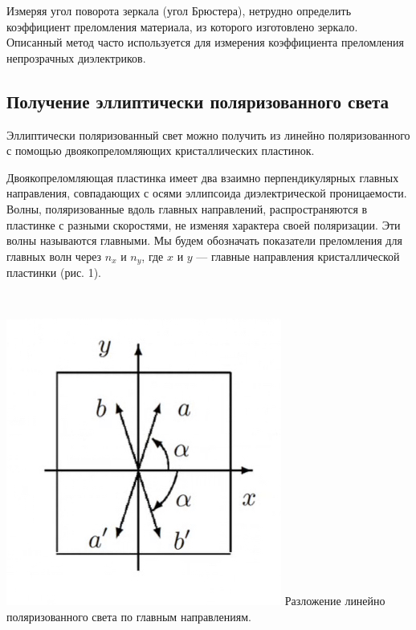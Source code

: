 \documentclass[14pt, a4paper]{report}
\begin{document}
Измеряя угол поворота зеркала (угол Брюстера), нетрудно определить коэффициент преломления материала, из которого изготовлено зеркало. Описанный метод часто используется для измерения коэффициента преломления непрозрачных диэлектриков.

\subsection{Получение эллиптически поляризованного света}


\begin{minipage}{0.6\textwidth}
Эллиптически поляризованный свет можно получить из линейно поляризованного с помощью двоякопреломляющих кристаллических пластинок.

Двоякопреломляющая пластинка имеет два взаимно перпендикулярных главных направления, совпадающих с осями эллипсоида диэлектрической проницаемости. Волны, поляризованные вдоль главных направлений, распространяются в пластинке с разными скоростями, не изменяя характера своей поляризации. Эти волны называются главными. Мы будем обозначать показатели преломления для главных волн через $ n_x $ и $ n_y $, где $ x $ и $ y $ --- главные направления кристаллической пластинки (рис. 1).
\end{minipage}
\begin{minipage}{0.05\textwidth}
\
\end{minipage}
\begin{minipage}{0.35\textwidth}
\includegraphics[width=\linewidth]{../images/473_1}
	Разложение линейно поляризованного света по главным направлениям. 
\end{minipage}
\end{document}
